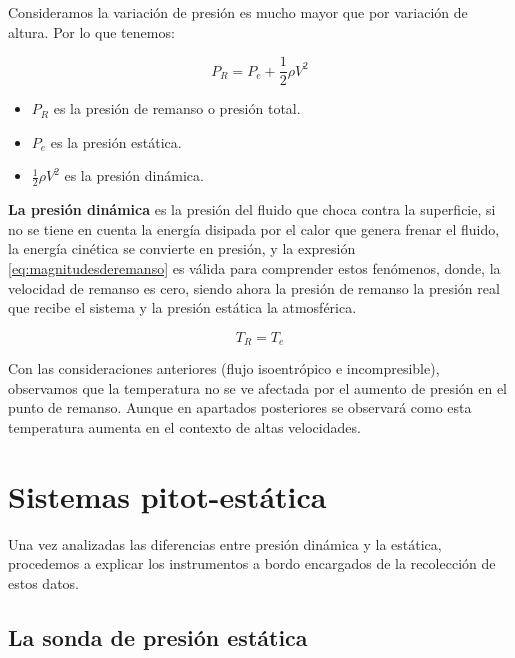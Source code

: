 Consideramos la variación de presión es mucho mayor que por variación de altura. Por lo que tenemos:

\begin{definicion}
    \begin{equation}
    P_R = P_e + \frac{1}{2} \rho V^2
    \label{eq:presionderemanso}
    \end{equation}
\end{definicion}

\begin{itemize}
	\item \( P_{R} \) es la presión de remanso o presión total.
	\item \( P_{e} \) es la presión estática.
	\item \( \frac{1}{2} \rho V^{2} \) es la presión dinámica. 
	\end{itemize}
\bigskip

\textbf{La presión dinámica} es la presión del fluido que choca contra la superficie, si no se tiene en cuenta la energía disipada por el calor que genera frenar el fluido, la energía cinética se convierte en presión, y la expresión \ref{eq:magnitudesderemanso} es válida para comprender estos fenómenos, donde, la velocidad de remanso es cero, siendo ahora la presión de remanso la presión real que recibe el sistema y la presión estática la atmosférica.

\begin{definicion}
    \begin{equation}
    T_R = T_e
    \end{equation}
\end{definicion}

Con las consideraciones anteriores (flujo isoentrópico e incompresible), observamos que la temperatura no se ve afectada por el aumento de presión en el punto de remanso. Aunque en apartados posteriores se observará como esta temperatura aumenta en el contexto de altas velocidades.


\section{Sistemas pitot-estática}
Una vez analizadas las diferencias entre presión dinámica y la estática, procedemos a explicar los instrumentos a bordo encargados de la recolección de estos datos.

\subsection{La sonda de presión estática}

